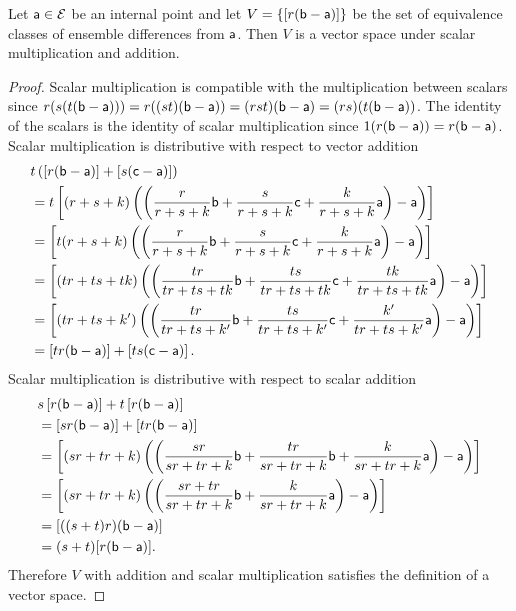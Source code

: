 \begin{mathSection}
	\begin{thrm}
		Let $\ens[a] \in \Ens$ be an internal point and let $V = \{ [r(\ens[b]-\ens[a])] \}$ be the set of equivalence classes of ensemble differences from $\ens[a]$. Then $V$ is a vector space under scalar multiplication and addition.
	\end{thrm}
	
	\begin{proof}
		Scalar multiplication is compatible with the multiplication between scalars since $r(s(t(\ens[b] - \ens[a])))= r((st)(\ens[b]-\ens[a])) = (rst)(\ens[b]-\ens[a]) = (rs)(t(\ens[b]-\ens[a]))$. The identity of the scalars is the identity of scalar multiplication since $1(r(\ens[b]-\ens[a])) = r(\ens[b] - \ens[a])$. Scalar multiplication is distributive with respect to vector addition
		\begin{equation}
			\begin{aligned}
				&t\left(\left[r(\ens[b] - \ens[a])\right] + \left[s(\ens[c] - \ens[a])\right]\right) \\
				&= t\left[(r+s+k) \left(\left(\frac{r}{r+s+k}\ens[b] + \frac{s}{r+s+k} \ens[c] +\frac{k}{r+s+k} \ens[a] \right) - \ens[a]\right)\right] \\
				&= \left[t(r+s+k) \left(\left(\frac{r}{r+s+k}\ens[b] + \frac{s}{r+s+k} \ens[c] +\frac{k}{r+s+k} \ens[a] \right) - \ens[a]\right)\right] \\
				&= \left[(tr+ts+tk) \left(\left(\frac{tr}{tr+ts+tk}\ens[b] + \frac{ts}{tr+ts+tk} \ens[c] +\frac{tk}{tr+ts+tk} \ens[a] \right) - \ens[a]\right)\right] \\
				&= \left[(tr+ts+k') \left(\left(\frac{tr}{tr+ts+k'}\ens[b] + \frac{ts}{tr+ts+k'} \ens[c] +\frac{k'}{tr+ts+k'} \ens[a] \right) - \ens[a]\right)\right] \\
				&=\left[tr(\ens[b] - \ens[a])\right] + \left[ts(\ens[c] - \ens[a])\right].
			\end{aligned}
		\end{equation}
		Scalar multiplication is distributive with respect to scalar addition
		\begin{equation}
			\begin{aligned}
				&s\left[r(\ens[b] - \ens[a])\right] + t\left[r(\ens[b] - \ens[a])\right] \\
				&=\left[sr(\ens[b] - \ens[a])\right] + \left[tr(\ens[b] - \ens[a])\right] \\
				&= \left[(sr+tr+k) \left(\left(\frac{sr}{sr+tr+k}\ens[b] + \frac{tr}{sr+tr+k} \ens[b] +\frac{k}{sr+tr+k} \ens[a] \right) - \ens[a]\right)\right] \\
				&= \left[(sr+tr+k) \left(\left(\frac{sr+tr}{sr+tr+k}\ens[b] + \frac{k}{sr+tr+k} \ens[a] \right) - \ens[a]\right)\right] \\
				&= [((s+t)r)(\ens[b]-\ens[a])] \\
				&= (s+t)[r(\ens[b]-\ens[a])].
			\end{aligned}
		\end{equation}
		Therefore $V$ with addition and scalar multiplication satisfies the definition of a vector space.
	\end{proof}
	

\end{mathSection}
